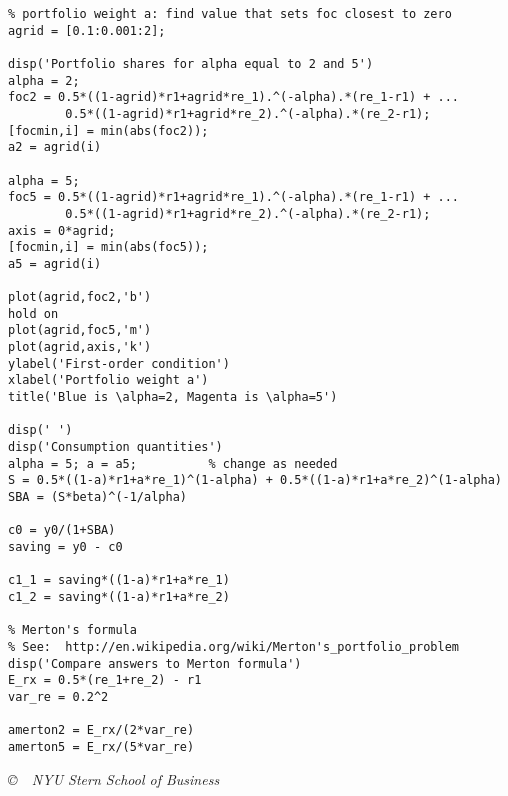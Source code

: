 \documentclass[11pt]{article}
\begin{document}
\begin{enumerate}
\begin{verbatim}
% portfolio weight a: find value that sets foc closest to zero
agrid = [0.1:0.001:2];

disp('Portfolio shares for alpha equal to 2 and 5')
alpha = 2;
foc2 = 0.5*((1-agrid)*r1+agrid*re_1).^(-alpha).*(re_1-r1) + ...
        0.5*((1-agrid)*r1+agrid*re_2).^(-alpha).*(re_2-r1);
[focmin,i] = min(abs(foc2));
a2 = agrid(i)

alpha = 5;
foc5 = 0.5*((1-agrid)*r1+agrid*re_1).^(-alpha).*(re_1-r1) + ...
        0.5*((1-agrid)*r1+agrid*re_2).^(-alpha).*(re_2-r1);
axis = 0*agrid;
[focmin,i] = min(abs(foc5));
a5 = agrid(i)

plot(agrid,foc2,'b')
hold on
plot(agrid,foc5,'m')
plot(agrid,axis,'k')
ylabel('First-order condition')
xlabel('Portfolio weight a')
title('Blue is \alpha=2, Magenta is \alpha=5')

disp(' ')
disp('Consumption quantities')
alpha = 5; a = a5;          % change as needed
S = 0.5*((1-a)*r1+a*re_1)^(1-alpha) + 0.5*((1-a)*r1+a*re_2)^(1-alpha)
SBA = (S*beta)^(-1/alpha)

c0 = y0/(1+SBA)
saving = y0 - c0

c1_1 = saving*((1-a)*r1+a*re_1)
c1_2 = saving*((1-a)*r1+a*re_2)

% Merton's formula
% See:  http://en.wikipedia.org/wiki/Merton's_portfolio_problem
disp('Compare answers to Merton formula')
E_rx = 0.5*(re_1+re_2) - r1
var_re = 0.2^2

amerton2 = E_rx/(2*var_re)
amerton5 = E_rx/(5*var_re)
\end{verbatim}

\end{enumerate}

\vfill
{\bigskip \centerline{\it \copyright \ \number\year \
NYU Stern School of Business}
}
\end{document}
